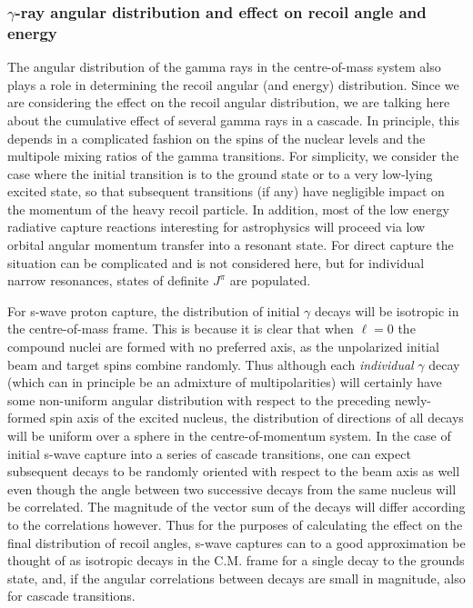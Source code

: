 \subsubsection{$\gamma$-ray angular distribution and effect on recoil angle and energy} 

The angular distribution of the gamma rays in the centre-of-mass system also plays a role in determining the recoil angular (and energy) distribution. Since we are considering the effect on the recoil angular distribution, we are talking here about the cumulative effect of several gamma rays in a cascade. In principle, this depends in a complicated fashion on the spins of the nuclear levels and the multipole mixing ratios of the gamma transitions. For simplicity, we consider the case where the initial transition is to the ground state or to a very low-lying excited state, so that subsequent transitions (if any) have negligible impact on the momentum of the heavy recoil particle. In addition, most of the low energy radiative capture reactions interesting for astrophysics will proceed via low orbital angular momentum transfer into a resonant state. For direct capture the situation can be complicated and is not considered here, but for individual narrow resonances, states of definite $J^{\pi}$ are populated.

For s-wave proton capture, the distribution of initial $\gamma$ decays will be isotropic in the centre-of-mass frame. This is because it is clear that when $\ell=0$ the compound nuclei are formed with no preferred axis, as the unpolarized initial beam and target spins combine randomly. Thus although each {\em individual} $\gamma$ decay (which can in principle be an admixture of multipolarities) will certainly have some non-uniform angular distribution with respect to the preceding newly-formed spin axis of the excited nucleus, the distribution of directions of all decays will be uniform over a sphere in the centre-of-momentum system. In the case of initial s-wave capture into a series of cascade transitions, one can expect subsequent decays to be randomly oriented with respect to the beam axis as well even though the angle between two successive decays from the same nucleus will be correlated. The magnitude of the vector sum of the decays will differ according to the correlations however. Thus for the purposes of calculating the effect on the final distribution of recoil angles, s-wave captures can to a good approximation be thought of as isotropic decays in the C.M. frame for a single decay to the grounds state, and,  if the angular correlations between decays are small in magnitude, also for cascade transitions.  

